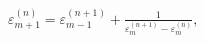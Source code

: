 $\varepsilon_{m+1}^{(n)}=\varepsilon_{m-1}^{(n+1)}+\frac{1}{\varepsilon_{m}^{(n%
+1)}-\varepsilon_{m}^{(n)}},$